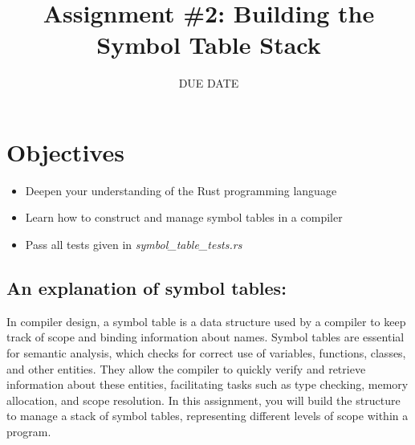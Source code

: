 \documentclass[
	12pt, %
]{fphw}
\title{Assignment \#2: Building the Symbol Table Stack} %
\date{DUE DATE} %
\institute{Union College} %
\begin{document}
\maketitle %


\section*{Objectives}

\begin{problem}
	\begin{itemize}
	    \item Deepen your understanding of the Rust programming language
        \item Learn how to construct and manage symbol tables in a compiler
        \item Pass all tests given in \textit{symbol\_table\_tests.rs}
        
	\end{itemize}
\end{problem}


\subsection*{An explanation of symbol tables:}
In compiler design, a symbol table is a data structure used by a compiler to keep track of scope and binding information about names. Symbol tables are essential for semantic analysis, which checks for correct use of variables, functions, classes, and other entities. They allow the compiler to quickly verify and retrieve information about these entities, facilitating tasks such as type checking, memory allocation, and scope resolution. In this assignment, you will build the structure to manage a stack of symbol tables, representing different levels of scope within a program.
\end{document}
